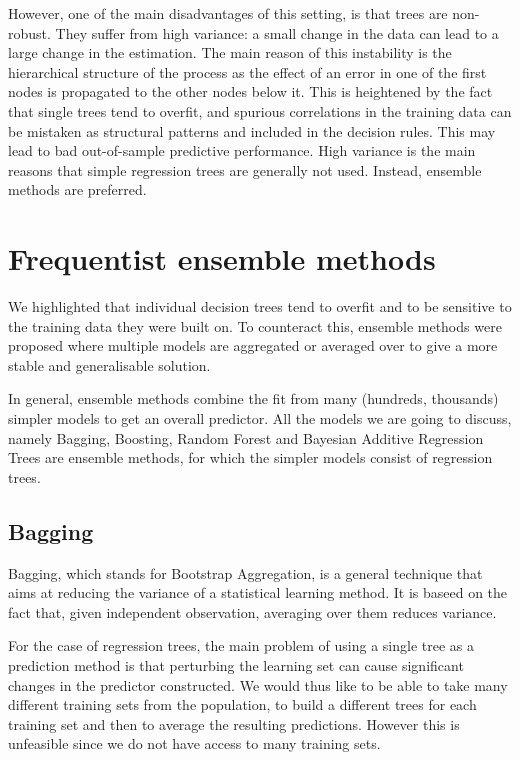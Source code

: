 \documentclass[a4paper,11pt]{article}
\begin{document}
However, one of the main disadvantages of this setting, is that trees are non-robust. They suffer from high variance: a small change in the data can lead to a large change in the estimation. The main reason of this instability is the hierarchical structure of the process as the effect of an error in one of the first nodes is propagated to the other nodes below it. This is heightened by the fact that single trees tend to overfit, and spurious correlations in the training data can be mistaken as structural patterns and included in the decision rules. This may lead to bad out-of-sample predictive performance. High variance is the main reasons that simple regression trees are generally not used. Instead, ensemble methods are preferred. 

\section{Frequentist ensemble methods}
\label{frequentist}

We highlighted that individual decision trees tend to overfit and to be sensitive to the training data they were built on. To counteract this, ensemble methods were proposed where multiple models
are aggregated or averaged over to give a more stable and
generalisable solution.

In general, ensemble methods combine the fit from many (hundreds, thousands) simpler models to get an overall predictor. 
All the models we are going to discuss, namely Bagging, Boosting, Random Forest and Bayesian Additive Regression Trees are ensemble methods, for which the simpler models consist of regression trees.


\subsection{Bagging}
Bagging, which stands for Bootstrap Aggregation, is a general technique that aims at reducing the variance of a statistical learning method. It is baseed on the fact that, given independent observation, averaging over them reduces variance.


For the case of regression trees, the main problem of using a single tree as a prediction method is that perturbing the learning set can cause significant changes in the predictor constructed. 
We would thus like to be able to take many different training sets from the population, to build a different trees for each training set and then to average the resulting predictions. However this is unfeasible since we do not have access to many training sets. 
\end{document}
